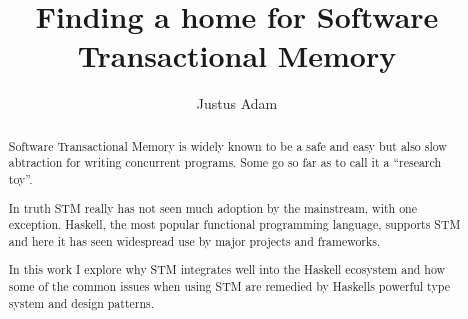 \documentclass[11pt,a4paper,sigconf]{acmart}
\begin{document}
\title{Finding a home for Software Transactional Memory}

\author{Justus Adam}


\begin{abstract}
  Software Transactional Memory is widely known to be a safe and easy but also
  slow abtraction for writing concurrent programs. Some go so far as to call
  it a ``research toy''\cite{research-toy}.

  In truth STM really has not seen much adoption by the mainstream, with one
  exception. Haskell, the most popular functional programming language, supports
  STM and here it has seen widespread use by major projects and frameworks.

  In this work I explore why STM integrates well into the Haskell ecosystem and
  how some of the common issues when using STM are remedied by Haskells powerful
  type system and design patterns.
\end{abstract}

\maketitle











\end{document}
